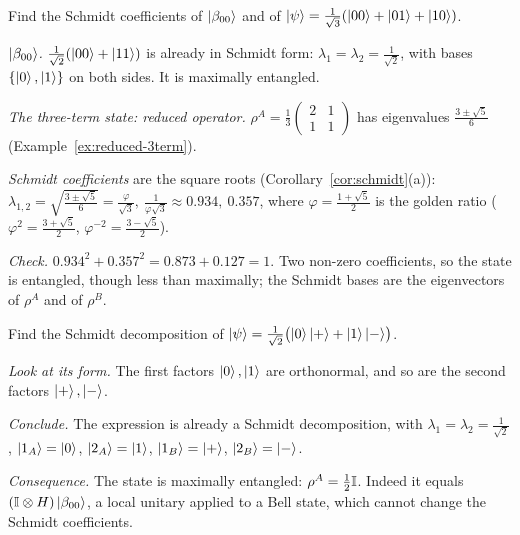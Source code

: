 \begin{example}\label{ex:schmidt}
  Find the Schmidt coefficients of $\left|\beta_{00}\right\rangle$ and of $\left|\psi\right\rangle=\frac1{\sqrt3}(\left|00\right\rangle+\left|01\right\rangle+\left|10\right\rangle)$.
\end{example}
\begin{solution}
  \begin{steps}
    \item \emph{$\left|\beta_{00}\right\rangle$.} $\frac1{\sqrt2}(\left|00\right\rangle+\left|11\right\rangle)$ is already in Schmidt form: $\lambda_1=\lambda_2=\tfrac1{\sqrt2}$, with bases $\{\left|0\right\rangle,\left|1\right\rangle\}$ on both sides. It is maximally entangled.
    \item \emph{The three-term state: reduced operator.} $\rho^A=\tfrac13\begin{pmatrix}2&1\\1&1\end{pmatrix}$ has eigenvalues $\tfrac{3\pm\sqrt5}{6}$ (Example~\ref{ex:reduced-3term}).
    \item \emph{Schmidt coefficients} are the square roots (Corollary~\ref{cor:schmidt}(a)): $\lambda_{1,2}=\sqrt{\tfrac{3\pm\sqrt5}{6}}=\frac{\varphi}{\sqrt3},\ \frac1{\varphi\sqrt3}\approx0.934,\ 0.357$, where $\varphi=\frac{1+\sqrt5}{2}$ is the golden ratio ($\varphi^2=\frac{3+\sqrt5}{2}$, $\varphi^{-2}=\frac{3-\sqrt5}2$).
    \item \emph{Check.} $0.934^2+0.357^2=0.873+0.127=1$. Two non-zero coefficients, so the state is entangled, though less than maximally; the Schmidt bases are the eigenvectors of $\rho^A$ and of $\rho^B$.
  \end{steps}
\end{solution}

\begin{example}\label{ex:schmidt-hand}
  Find the Schmidt decomposition of $\left|\psi\right\rangle=\frac1{\sqrt2}\bigl(\left|0\right\rangle\left|+\right\rangle+\left|1\right\rangle\left|-\right\rangle\bigr)$.
\end{example}
\begin{solution}
  \begin{steps}
    \item \emph{Look at its form.} The first factors $\left|0\right\rangle,\left|1\right\rangle$ are orthonormal, and so are the second factors $\left|+\right\rangle,\left|-\right\rangle$.
    \item \emph{Conclude.} The expression is already a Schmidt decomposition, with $\lambda_1=\lambda_2=\tfrac1{\sqrt2}$, $\left|1_A\right\rangle=\left|0\right\rangle$, $\left|2_A\right\rangle=\left|1\right\rangle$, $\left|1_B\right\rangle=\left|+\right\rangle$, $\left|2_B\right\rangle=\left|-\right\rangle$.
    \item \emph{Consequence.} The state is maximally entangled: $\rho^A=\tfrac12\mathbb{I}$. Indeed it equals $(\mathbb{I}\otimes H)\left|\beta_{00}\right\rangle$, a local unitary applied to a Bell state, which cannot change the Schmidt coefficients.
  \end{steps}
\end{solution}

